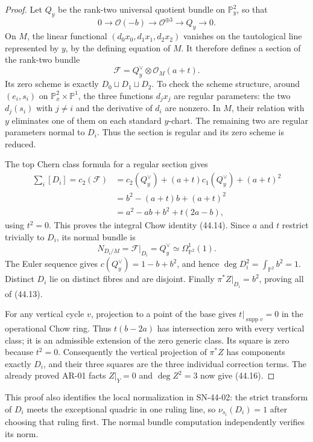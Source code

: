 \documentclass[11pt,a4paper]{article}
\theoremstyle{definition}
\theoremstyle{remark}
\begin{document}
\begin{proof}
Let $Q_y$ be the rank-two universal quotient bundle on
$\mathbb P^2_y$, so that
\[
 0\longrightarrow\mathcal O(-b)\longrightarrow
 \mathcal O^{\oplus3}\longrightarrow Q_y\longrightarrow0.
\]
On $M$, the linear functional
$(d_0x_0,d_1x_1,d_2x_2)$ vanishes on the tautological line represented
by $y$, by the defining equation of $M$.  It therefore defines a
section of the rank-two bundle
\[
 \mathcal F=Q_y^\vee\otimes\mathcal O_M(a+t).
\]
Its zero scheme is exactly $D_0\sqcup D_1\sqcup D_2$.
To check the scheme structure, around $(e_i,s_i)$ on
$\mathbb P^2_x\times\mathbb P^1$, the three functions $d_jx_j$
are regular parameters: the two $d_j(s_i)$ with $j\ne i$ and
the derivative of $d_i$ are nonzero.  In $M$, their relation with
$y$ eliminates one of them on each standard $y$-chart.  The
remaining two are regular parameters normal to $D_i$.
Thus the section is regular and its zero scheme is reduced.

The top Chern class formula for a regular section gives
\[
 \begin{split}
 \sum_i[D_i]=c_2(\mathcal F)
 &=c_2(Q_y^\vee)+(a+t)c_1(Q_y^\vee)+(a+t)^2\\
 &=b^2-(a+t)b+(a+t)^2\\
 &=a^2-ab+b^2+t(2a-b),
 \end{split}
\]
using $t^2=0$.  This proves the integral Chow identity (44.14).
Since $a$ and $t$ restrict trivially to $D_i$, its normal bundle is
\[
 N_{D_i/M}=\mathcal F|_{D_i}=Q_y^\vee
             \simeq\Omega^1_{\mathbb P^2}(1).
\]
The Euler sequence gives $c(Q_y^\vee)=1-b+b^2$, and hence
$\deg D_i^2=\int_{\mathbb P^2}b^2=1$.  Distinct $D_i$ lie on
distinct fibres and are disjoint.  Finally
$\pi^*Z|_{D_i}=b^2$, proving all of (44.13).

For any vertical cycle $v$, projection to a point of the base gives
$t|_{\operatorname{supp}v}=0$ in the operational Chow ring.  Thus
$t(b-2a)$ has intersection zero with every vertical class; it is an
admissible extension of the zero generic class.  Its square is zero
because $t^2=0$.  Consequently the vertical projection of $\pi^*Z$
has components exactly $D_i$, and their three squares are the three
individual correction terms.  The already proved AR-01 facts
$Z|_Y=0$ and $\deg Z^2=3$ now give (44.16).
\end{proof}

This proof also identifies the local normalization in SN-44-02:
the strict transform of $D_i$ meets the exceptional quadric in one
ruling line, so $\nu_{s_i}(D_i)=1$ after choosing that ruling first.
The normal bundle computation independently verifies its norm.
\end{document}
